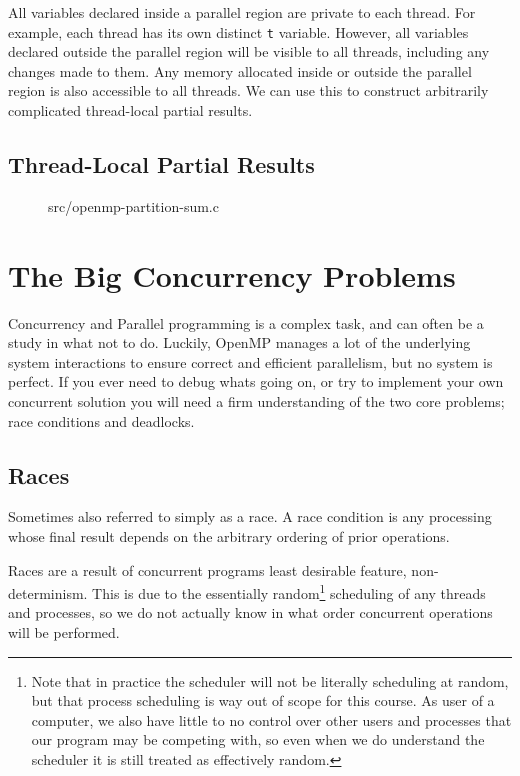 All variables declared inside a parallel region are private to each
thread. For example, each thread has its own distinct \texttt{t}
variable. However, all variables declared outside the parallel region
will be visible to all threads, including any changes made to them.
Any memory allocated inside or outside the parallel region is also
accessible to all threads. We can use this to construct arbitrarily
complicated thread-local partial results.

\subsection{Thread-Local Partial Results}

\begin{figure}

{src/openmp-partition-sum.c}
\end{figure}


\section{The Big Concurrency Problems}

Concurrency and Parallel programming is a complex task, and can often
be a study in what not to do. Luckily, OpenMP manages a lot of the
underlying system interactions to ensure correct and efficient
parallelism, but no system is perfect. If you ever need to debug whats
going on, or try to implement your own concurrent solution you will
need a firm understanding of the two core problems; race conditions
and deadlocks.

\subsection{Races}

\begin{definition}
  Sometimes also referred to simply as a race. A race condition is any processing whose final result depends on the arbitrary ordering of prior operations.
\end{definition}

Races are a result of concurrent programs least desirable feature, non-determinism. This is due to the essentially random\footnote{Note that in practice the scheduler will not be literally scheduling at random, but that process scheduling is way out of scope for this course. As user of a computer, we also have little to no control over other users and processes that our program may be competing with, so even when we do understand the scheduler it is still treated as effectively random.} scheduling of any threads and processes, so we do not actually know in what order concurrent operations will be performed.

